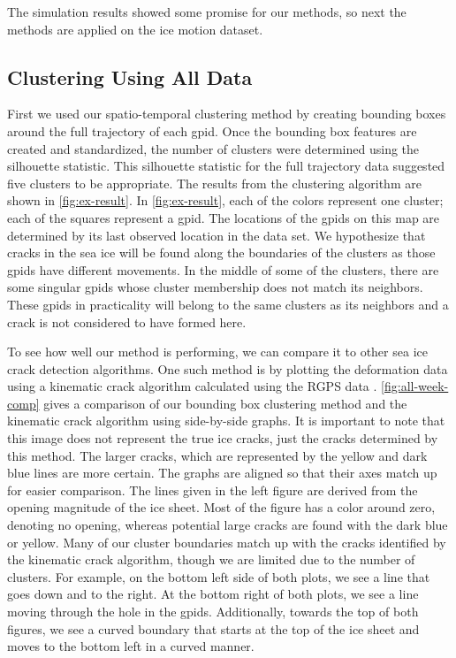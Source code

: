 \documentclass[12pt]{article}
\begin{document}
The simulation results showed some promise for our methods, so next the
methods are applied on the ice motion dataset.

\hypertarget{clustering-using-all-data}{%
\subsection{Clustering Using All Data}\label{clustering-using-all-data}}

First we used our spatio-temporal clustering method by creating bounding
boxes around the full trajectory of each gpid. Once the bounding box
features are created and standardized, the number of clusters were
determined using the silhouette statistic. This silhouette statistic for
the full trajectory data suggested five clusters to be appropriate. The
results from the clustering algorithm are shown in \cref{fig:ex-result}.
In \cref{fig:ex-result}, each of the colors represent one cluster; each
of the squares represent a gpid. The locations of the gpids on this map
are determined by its last observed location in the data set. We
hypothesize that cracks in the sea ice will be found along the
boundaries of the clusters as those gpids have different movements. In
the middle of some of the clusters, there are some singular gpids whose
cluster membership does not match its neighbors. These gpids in
practicality will belong to the same clusters as its neighbors and a
crack is not considered to have formed here.

To see how well our method is performing, we can compare it to other sea
ice crack detection algorithms. One such method is by plotting the
deformation data using a kinematic crack algorithm calculated using the
RGPS data \citep{peterson_evaluating_2011}. \cref{fig:all-week-comp}
gives a comparison of our bounding box clustering method and the
kinematic crack algorithm using side-by-side graphs. It is important to
note that this image does not represent the true ice cracks, just the
cracks determined by this method. The larger cracks, which are
represented by the yellow and dark blue lines are more certain. The
graphs are aligned so that their axes match up for easier comparison.
The lines given in the left figure are derived from the opening
magnitude of the ice sheet. Most of the figure has a color around zero,
denoting no opening, whereas potential large cracks are found with the
dark blue or yellow. Many of our cluster boundaries match up with the
cracks identified by the kinematic crack algorithm, though we are
limited due to the number of clusters. For example, on the bottom left
side of both plots, we see a line that goes down and to the right. At
the bottom right of both plots, we see a line moving through the hole in
the gpids. Additionally, towards the top of both figures, we see a
curved boundary that starts at the top of the ice sheet and moves to the
bottom left in a curved manner.
\end{document}
